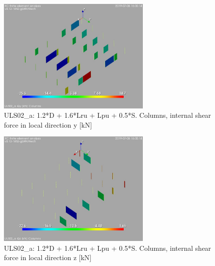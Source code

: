 \begin{figure}
\begin{center}
\includegraphics[width=75mm]{annex_res_columns/graphics/resSimplLC/ULS02_acolumnsQy}
\caption{ULS02\_a: 1.2*D + 1.6*Lru + Lpu + 0.5*S. Columns, internal shear force in local direction y [kN]}
\end{center}
\end{figure}
\begin{figure}
\begin{center}
\includegraphics[width=75mm]{annex_res_columns/graphics/resSimplLC/ULS02_acolumnsQz}
\caption{ULS02\_a: 1.2*D + 1.6*Lru + Lpu + 0.5*S. Columns, internal shear force in local direction z [kN]}
\end{center}
\end{figure}

